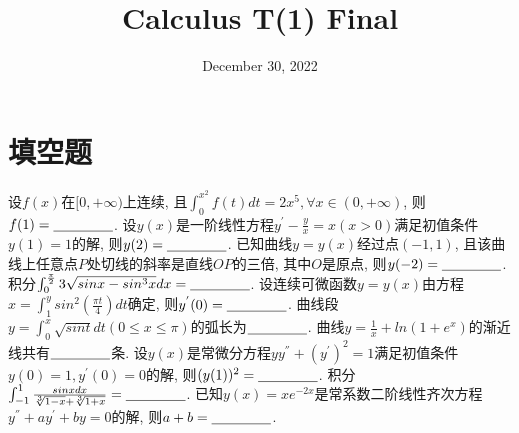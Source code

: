 \documentclass{exam}
\title{Calculus T(1) Final}
\date{December 30, 2022}
\begin{document}
\maketitle
\section{填空题}
\begin{questions}
    \question[3]设$f(x)$在$[0,+\infty)$上连续, 且$\int_{0}^{x^2}f(t)dt=2x^5,\forall x \in (0,+\infty)$, 则$f(1)=\underline{\hspace{1.5cm}}$.
    \question[3]设$y(x)$是一阶线性方程$y^{'}-\frac{y}{x}=x (x>0)$满足初值条件$y(1)=1$的解, 则$y(2)=\underline{\hspace{1.5cm}}$.
    \question[3]已知曲线$y=y(x)$经过点$(-1,1)$, 且该曲线上任意点$P$处切线的斜率是直线$OP$的三倍, 其中$O$是原点, 则$y(-2)=\underline{\hspace{1.5cm}}$.
    \question[3]积分$\int_{0}^{\frac{\pi}{2}}3\sqrt{sin x-sin^3x}dx=\underline{\hspace{1.5cm}}$.
    \question[3]设连续可微函数$y=y(x)$由方程$x=\int_{1}^{y}sin^2(\frac{\pi t}{4})dt$确定, 则$y^{'}(0)=\underline{\hspace{1.5cm}}$.
    \question[3]曲线段$y=\int_{0}^{x}\sqrt{sin t}dt (0 \leq x \leq \pi)$的弧长为$\underline{\hspace{1.5cm}}$.
    \question[3]曲线$y=\frac{1}{x}+ln(1+e^x)$的渐近线共有$\underline{\hspace{1.5cm}}$条.
    \question[3]设$y(x)$是常微分方程$yy^{''}+(y^{'})^2=1$满足初值条件$y(0)=1,y^{'}(0)=0$的解, 则$(y(1))^2=\underline{\hspace{1.5cm}}$.
    \question[3]积分$\int_{-1}^{1}\frac{sin x dx}{\sqrt[3]{1-x}+\sqrt[3]{1+x}}=\underline{\hspace{1.5cm}}$.
    \question[3]已知$y(x)=xe^{-2x}$是常系数二阶线性齐次方程$y^{''}+ay^{'}+by=0$的解, 则$a+b=\underline{\hspace{1.5cm}}$.
\end{questions}
\end{document}
